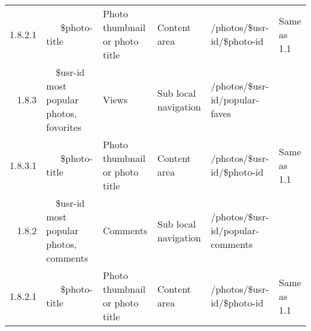 \documentclass[12pt,a4paper]{article}
\begin{document}
\begin{landscape}
\begin{table}[h!b!p!]
\begin{center}
\begin{tiny}
\begin{tabular}{r|l|l|l|l|p{3cm}}
                  1.8.2.1 &
                  ~~~\$photo-title &
                  Photo thumbnail or photo title &
                  Content area &
                  /photos/\$usr-id/\$photo-id &
                  Same as 1.1 \\

                1.8.3 &
                ~~\$usr-id most popular photos, fovorites &
                Views &
                Sub local navigation &
                /photos/\$usr-id/popular-faves &
                \\

                  1.8.3.1 &
                  ~~~\$photo-title &
                  Photo thumbnail or photo title &
                  Content area &
                  /photos/\$usr-id/\$photo-id &
                  Same as 1.1 \\

                1.8.2 &
                ~~\$usr-id most popular photos, comments &
                Comments &
                Sub local navigation &
                /photos/\$usr-id/popular-comments &
                \\

                  1.8.2.1 &
                  ~~~\$photo-title &
                  Photo thumbnail or photo title &
                  Content area &
                  /photos/\$usr-id/\$photo-id &
                  Same as 1.1 \\

          \end{tabular}
        \rm
      \end{tiny}
    \end{center}
  \end{table}
\end{landscape}
\end{document}
